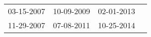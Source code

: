 \begin{supertabular}{llll}
 03-15-2007 &  10-09-2009 &  02-01-2013 \\
 11-29-2007 &  07-08-2011 &  10-25-2014 \\
\end{supertabular}
